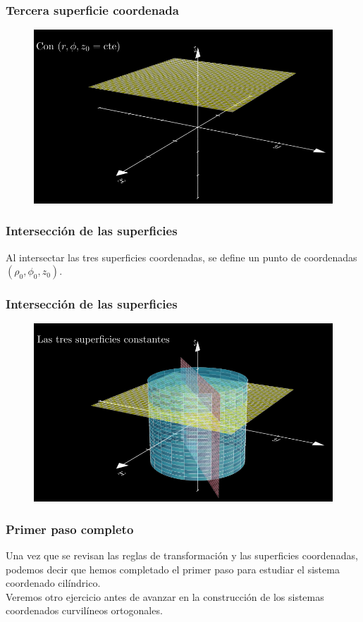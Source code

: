 \documentclass[12pt]{beamer}
\begin{document}
{ %
\begin{frame}
\frametitle{Tercera superficie coordenada}
\begin{figure}
   \centering
   \includegraphics[width=0.95\linewidth]{Imagenes/superficies_cilindricas_03.png}
   \label{fig:superficies_cilindricas_03}
\end{figure}
\end{frame}
}
\begin{frame}
\frametitle{Intersección de las superficies}
Al intersectar las tres superficies coordenadas, se define un punto de coordenadas $(\rho_{0}, \phi_{0}, z_{0})$.
\end{frame}
{ %
\begin{frame}
\frametitle{Intersección de las superficies}
\begin{figure}
   \centering
   \includegraphics[width=0.95\linewidth]{Imagenes/superficies_cilindricas_04.png}
   \label{fig:superficies_cilindricas_04}
\end{figure}
\end{frame}
}
\begin{frame}
\frametitle{Primer paso completo}
Una vez que se revisan las reglas de transformación y las superficies coordenadas, podemos decir que hemos completado el primer paso para estudiar el sistema coordenado cilíndrico.
\\
\bigskip
\pause
Veremos otro ejercicio antes de avanzar en la construcción de los sistemas coordenados curvilíneos ortogonales.
\end{frame}
\end{document}
